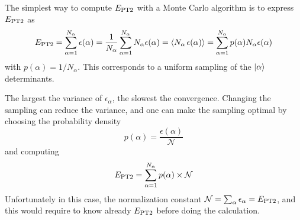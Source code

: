 \documentclass[./thesis.tex]{subfiles}
\begin{document}
The simplest way to compute $E_\text{PT2}$ with a Monte Carlo algorithm is to express $E_\text{PT2}$ as
\begin{equation}
\EPT %
= \sum_{\alpha = 1}^{N_\alpha} \epsilon(\alpha)
= \frac{1}{N_\alpha} \sum_{\alpha = 1}^{N_\alpha} N_\alpha \epsilon(\alpha)
= \langle N_\alpha\, \epsilon(\alpha) \rangle
= \sum_{\alpha = 1}^{N_\alpha} p(\alpha) N_\alpha \epsilon(\alpha) 
\end{equation}
with $p(\alpha) = 1 / N_\alpha$. This corresponds to a uniform sampling of the ${\ket{\alpha}}$ determinants.

The largest the variance of $\epsilon_\alpha$, the slowest the convergence. Changing the sampling can reduce the variance, and one can make the sampling optimal by choosing the probability density
\begin{equation}
p(\alpha) = \frac{\epsilon(\alpha)}{\mathcal{N}}
\end{equation}
and computing
\begin{equation}
E_\text{PT2} = \sum_{\alpha = 1}^{N_\alpha} p(\alpha) \times \mathcal{N}
\end{equation}
Unfortunately in this case, the normalization constant $\mathcal{N} =
\sum_\alpha \epsilon_\alpha = E_\text{PT2}$, and this would require to know already
$E_\text{PT2}$ before doing the calculation.
\end{document}
